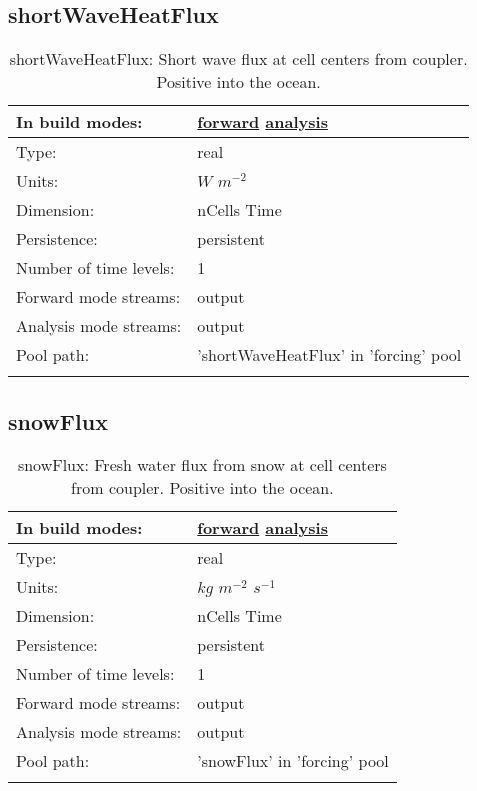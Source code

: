 \subsection[shortWaveHeatFlux]{shortWaveHeatFlux}
\label{subsec:var_sec_forcing_shortWaveHeatFlux}
\begin{center}
\begin{longtable}{| p{2.0in} | p{4.0in} |}
        \hline 
        In build modes: & \hyperref[subsec:forward_var_tab_forcing]{forward} \hyperref[subsec:analysis_var_tab_forcing]{analysis} \\
        \hline 
        Type: & real \\
        \hline 
        Units: & $W$ $m^{-2}$ \\
        \hline 
        Dimension: & nCells Time \\
        \hline 
        Persistence: & persistent \\
        \hline 
        Number of time levels: & 1 \\
        \hline 
		 Forward mode streams: &  output \\
        \hline 
		 Analysis mode streams: &  output \\
        \hline 
            Pool path: & 'shortWaveHeatFlux' in 'forcing' pool
 \\
		 \hline 
    \caption{shortWaveHeatFlux: Short wave flux at cell centers from coupler. Positive into the ocean.}
\end{longtable}
\end{center}
\subsection[snowFlux]{snowFlux}
\label{subsec:var_sec_forcing_snowFlux}
\begin{center}
\begin{longtable}{| p{2.0in} | p{4.0in} |}
        \hline 
        In build modes: & \hyperref[subsec:forward_var_tab_forcing]{forward} \hyperref[subsec:analysis_var_tab_forcing]{analysis} \\
        \hline 
        Type: & real \\
        \hline 
        Units: & $kg$ $m^{-2}$ $s^{-1}$ \\
        \hline 
        Dimension: & nCells Time \\
        \hline 
        Persistence: & persistent \\
        \hline 
        Number of time levels: & 1 \\
        \hline 
		 Forward mode streams: &  output \\
        \hline 
		 Analysis mode streams: &  output \\
        \hline 
            Pool path: & 'snowFlux' in 'forcing' pool
 \\
		 \hline 
    \caption{snowFlux: Fresh water flux from snow at cell centers from coupler. Positive into the ocean.}
\end{longtable}
\end{center}
